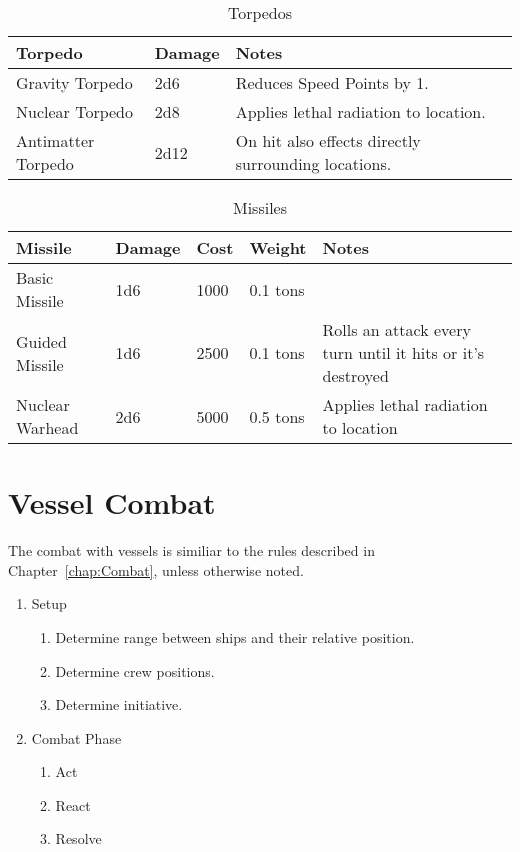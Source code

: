 \begin{table}
  \centering
  \caption{Torpedos}
  \begin{tabular}{|l|l|l|}
    \hline
    Torpedo            & Damage & Notes                                               \\ \hline
    Gravity Torpedo    & 2d6   & Reduces Speed Points by 1.                          \\ \hline
    Nuclear Torpedo    & 2d8   & Applies lethal radiation to location.               \\ \hline
    Antimatter Torpedo & 2d12   & On hit also effects directly surrounding locations. \\ \hline
  \end{tabular}
\end{table}

\begin{table}
  \centering
  \caption{Missiles}
  \begin{tabular}{|l|l|l|l|l|}
    \hline
    Missile         & Damage & Cost & Weight   & Notes                                                      \\ \hline
    Basic Missile   & 1d6    & 1000 & 0.1 tons & ~                                                          \\ \hline
    Guided Missile  & 1d6    & 2500 & 0.1 tons & Rolls an attack every turn until it hits or it's destroyed \\ \hline
    Nuclear Warhead & 2d6    & 5000 & 0.5 tons & Applies lethal radiation to location                       \\ \hline
  \end{tabular}
\end{table}

\chapter{Vessel Combat}
\label{chap:Vessel Combat}

The combat with vessels is similiar to the rules described in Chapter~\ref{chap:Combat}, unless otherwise noted.

\begin{enumerate}
  \item Setup
  \begin{enumerate}
    \item Determine range between ships and their relative position.
    \item Determine crew positions.
    \item Determine initiative.
  \end{enumerate}
  \item Combat Phase
  \begin{enumerate}
    \item Act
    \item React
    \item Resolve
  \end{enumerate}
\end{enumerate}

